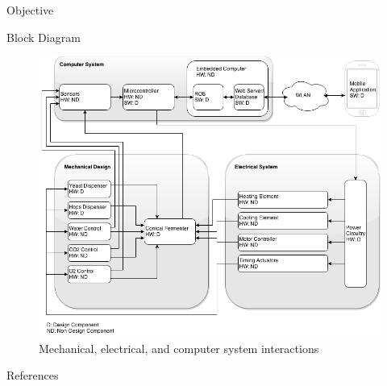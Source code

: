 \documentclass[final]{beamer}
\newlength{\onecolwid}
\begin{document}
\begin{frame}[t]
\begin{columns}[t]
\begin{column}{\onecolwid}
\begin{block}{Objective}
\end{block}


\begin{block}{Block Diagram}

\begin{figure}
\includegraphics[width=\linewidth]{block-diagram.png}
\caption{Mechanical, electrical, and computer system interactions}
\end{figure}

\end{block}


\begin{block}{References}

\nocite{*} %
\small{
\vspace{0.75in}}

\end{block}



\end{column}
\end{columns}
\end{frame}
\end{document}
